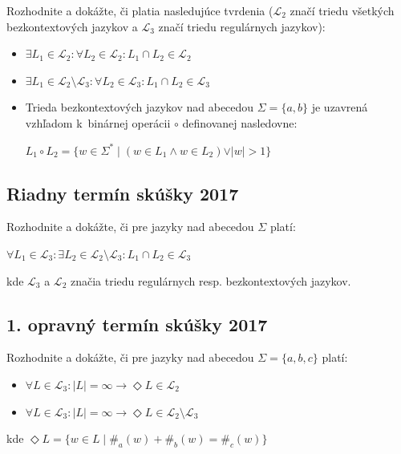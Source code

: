 \documentclass[11pt,a4paper]{article}
\begin{document}
		Rozhodnite a dokážte, či platia nasledujúce tvrdenia ($\mathcal{L}_2$ značí triedu všetkých bezkontextových jazykov a $\mathcal{L}_3$ značí triedu regulárnych jazykov):

		\begin{itemize}
			\item $\exists L_1 \in \mathcal{L}_2: \forall L_2 \in \mathcal{L}_2: L_1 \cap L_2 \in \mathcal{L}_2$

			\item $\exists L_1 \in \mathcal{L}_2 \setminus \mathcal{L}_3: \forall L_2 \in \mathcal{L}_3: L_1 \cap L_2 \in \mathcal{L}_3$

			\item Trieda bezkontextových jazykov nad abecedou $\Sigma = \{a,b\}$ je uzavrená vzhľadom k~binárnej operácii $\circ$ definovanej nasledovne:

			$L_1 \circ L_2 = \{w \in \Sigma^* \mid (w \in L_1 \land w \in L_2) \lor \vert w \vert > 1\}$
		\end{itemize}

		\subsection{Riadny termín skúšky 2017}

		Rozhodnite a dokážte, či pre jazyky nad abecedou $\Sigma$ platí:

		$\forall L_1 \in \mathcal{L}_3: \exists L_2 \in \mathcal{L}_2 \setminus \mathcal{L}_3: L_1 \cap L_2 \in \mathcal{L}_3$

		kde $\mathcal{L}_3$ a $\mathcal{L}_2$ značia triedu regulárnych resp. bezkontextových jazykov.

		\subsection{1. opravný termín skúšky 2017}

		Rozhodnite a dokážte, či pre jazyky nad abecedou $\Sigma = \{a,b,c\}$ platí:

		\begin{itemize}
			\item $\forall L \in \mathcal{L}_3: \vert L \vert = \infty \rightarrow \Diamond L \in  \mathcal{L}_2$
			\item $\forall L \in \mathcal{L}_3: \vert L \vert = \infty \rightarrow \Diamond L \in  \mathcal{L}_2 \setminus \mathcal{L}_3$
		\end{itemize}

		kde $\Diamond L = \{w \in L \mid \#_a(w) + \#_b(w) = \#_c(w)\}$
\end{document}
